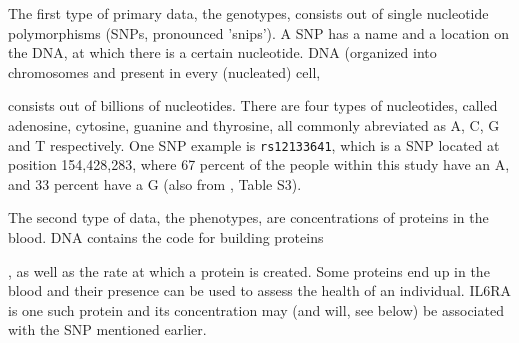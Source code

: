 The first type of primary data, the genotypes, 
consists out of single nucleotide polymorphisms (SNPs, pronounced 'snips').
A SNP has a name and a location on the DNA, at which there is a certain nucleotide.
DNA (organized into chromosomes and present in every (nucleated) cell, 

consists out of billions of nucleotides.
There are four types of nucleotides, 
called adenosine, cytosine, guanine and thyrosine, all commonly abreviated
as A, C, G and T respectively.
One SNP example is \verb|rs12133641|, which is a SNP located at position 
154,428,283, where 67 percent of the people within this study have an A,
and 33 percent have a G (also from \cite{ahsan2017relative}, Table S3).

The second type of data, the phenotypes, 
are concentrations of proteins in the blood. 
DNA contains the code for building proteins

, as well as the rate
at which a protein is created. Some proteins end up in the blood and
their presence can be used to assess the health of an individual.
IL6RA is one such protein and its concentration may (and will, see below)
be associated with the SNP mentioned earlier.

